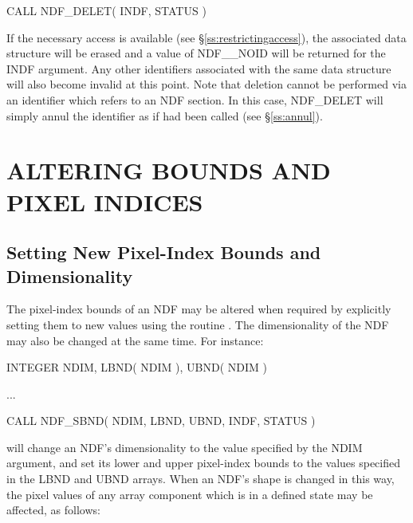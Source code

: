 \documentclass[twoside,11pt,nolof]{starlink}
\begin{document}
\small
\begin{terminalv}
      CALL NDF_DELET( INDF, STATUS )
\end{terminalv}
\normalsize

If the necessary access is available (see \S\ref{ss:restrictingaccess}), the
associated data structure will be erased and a value of NDF\_\_NOID will be
returned for the INDF argument.
Any other identifiers associated with the same data structure will also become
invalid at this point.
Note that deletion cannot be performed via an identifier which refers to an
NDF section.
In this case, NDF\_DELET will simply annul the identifier as if 
had been called (see \S\ref{ss:annul}).


\section{ALTERING BOUNDS AND PIXEL INDICES}

\subsection{\label{ss:sbnd}Setting New Pixel-Index Bounds and Dimensionality}

The pixel-index bounds of an NDF may be altered when required by explicitly
setting them to new values using the routine .
The dimensionality of the NDF may also be changed at the same time.
For instance:

\small
\begin{terminalv}
      INTEGER NDIM, LBND( NDIM ), UBND( NDIM )

      ...

      CALL NDF_SBND( NDIM, LBND, UBND, INDF, STATUS )
\end{terminalv}
\normalsize

will change an NDF's dimensionality to the value specified by the NDIM
argument, and set its lower and upper pixel-index bounds to the values
specified in the LBND and UBND arrays.
When an NDF's shape is changed in this way, the pixel values of any array
component which is in a defined state may be affected, as follows:
\end{document}
